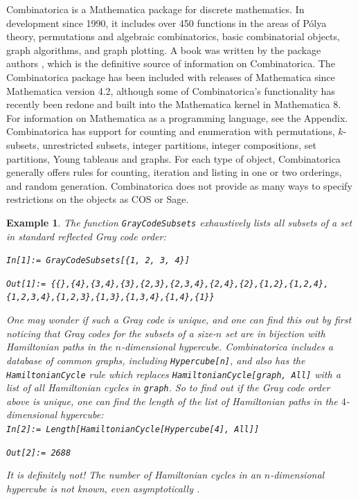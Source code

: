 \documentclass[12pt]{article}
\theoremstyle{plain}
\newtheorem{exa}{Example}
\newcommand{\codefont}[1]{{\fontshape{n}\texttt{#1}}}
\newenvironment{snippet}{\vspace{10px}\fontfamily{ppl}\selectfont}{\vspace{10px}}
\begin{document}
Combinatorica is a Mathematica package for discrete mathematics.
In development since 1990, it includes over 450 functions in the areas of P\'olya theory, permutations and algebraic combinatorics, basic combinatorial objects, graph algorithms, and graph plotting.
A book was written by the package authors \cite{skiena}, which is the definitive source of information on Combinatorica.
The Combinatorica package has been included with releases of Mathematica since Mathematica version 4.2, although some of Combinatorica's functionality has recently been redone and built into the Mathematica kernel in Mathematica 8.
For information on Mathematica as a programming language, see the Appendix.\\

Combinatorica has support for counting and enumeration with permutations, \(k\)-subsets, unrestricted subsets, integer partitions, integer compositions, set partitions, Young tableaus and graphs.
For each type of object, Combinatorica generally offers rules for
counting, iteration and listing in one or two orderings,
and random generation.
Combinatorica does not provide as many ways to specify restrictions on the objects as COS or Sage.

\begin{exa}
The function \codefont{GrayCodeSubsets} exhaustively lists all subsets of a set in standard reflected Gray code order:

\begin{snippet}
\codefont{In[1]:= GrayCodeSubsets[\{1, 2, 3, 4\}]}

\codefont{Out[1]:= \{\{\},\{4\},\{3,4\},\{3\},\{2,3\},\{2,3,4\},\{2,4\},\{2\},\{1,2\},\{1,2,4\},}\\
\codefont{\{1,2,3,4\},\{1,2,3\},\{1,3\},\{1,3,4\},\{1,4\},\{1\}\}}
\end{snippet}

One may wonder if such a Gray code is unique,
and one can find this out by first noticing that Gray codes for the subsets of a size-\(n\) set are in bijection with Hamiltonian paths in the \(n\)-dimensional hypercube.
Combinatorica includes a database of common graphs, including \codefont{Hypercube[n]}, and also has the \codefont{HamiltonianCycle} rule which replaces \codefont{HamiltonianCycle[graph, All]} with a list of all Hamiltonian cycles in \codefont{graph}.
So to find out if the Gray code order above is unique, one can find the length of the list of Hamiltonian paths in the \(4\)-dimensional hypercube:\\

\begin{snippet}
\codefont{In[2]:= Length[HamiltonianCycle[Hypercube[4], All]]}

\codefont{Out[2]:= 2688}
\end{snippet}

It is definitely not!
The number of Hamiltonian cycles in an \(n\)-dimensional hypercube is not known, even asymptotically \cite{W89}.
\end{exa}
\end{document}
